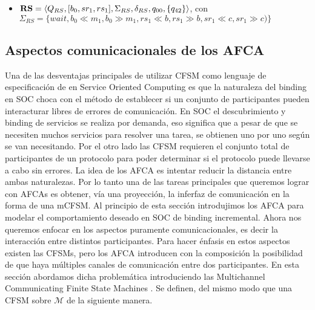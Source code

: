 \begin{example}
\begin{itemize}
\begin{center}
\end{center}
    \item $\mathbf{RS} =\langle Q_{RS}, [b_0, sr_1, rs_1], \Sigma_{RS}, \delta_{RS}, q_{00}, \{q_{42}\} \rangle$, con $\Sigma_{RS} =\{wait, b_0 \ll m_1,b_0 \gg m_1, rs_1 \ll b, rs_1 \gg b, sr_1 \ll c, sr_1 \gg c) \}$
\begin{center}
\end{center}
\end{itemize} 
\end{example}


\subsection{Aspectos comunicacionales de los AFCA}
Una de las desventajas principales de utilizar CFSM como lenguaje de especificación de en Service Oriented Computing es que la naturaleza del binding en SOC choca con el método de establecer si un conjunto de participantes pueden interacturar libres de errores de comunicación. En SOC el descubrimiento y binding de servicios se realiza por demanda, eso significa que a pesar de que se necesiten muchos servicios para resolver una tarea, se obtienen uno por uno según se van necesitando. Por el otro lado las CFSM requieren el conjunto total de participantes de un protocolo para poder determinar si el protocolo puede llevarse a cabo sin errores. La idea de los AFCA es intentar reducir la distancia entre ambas naturalezas. Por lo tanto una de las tareas principales que queremos lograr con AFCAs es obtener, vía una proyección, la inferfaz de comunicación en la forma de una mCFSM.
Al principio de esta sección introdujimos los AFCA para modelar el comportamiento deseado en SOC de binding incremental. Ahora nos queremos enfocar en los aspectos puramente comunicacionales, es decir la interacción entre distintos participantes. Para hacer énfasis en estos aspectos existen las CFSMs, pero los AFCA introducen con la composición la posibilidad de que haya múltiples canales de comunicación entre dos participantes. En esta sección abordamos dicha problemática introduciendo las Multichannel Communicating Finite State Machines \cite[Def.~82]{vissani:phdthesis}. Se definen, del mismo modo que una CFSM sobre $\mathcal{M}$ de la siguiente manera.

